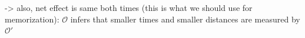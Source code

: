 \documentclass[../relativity_main.tex]{subfiles}
\begin{document}
\begin{ex}


	-> also, net effect is same both times (this is what we should use for memorization): $\mathcal{O}$ infers that smaller times and smaller distances are measured by $\mathcal{O}'$


\end{ex}



\end{document}
